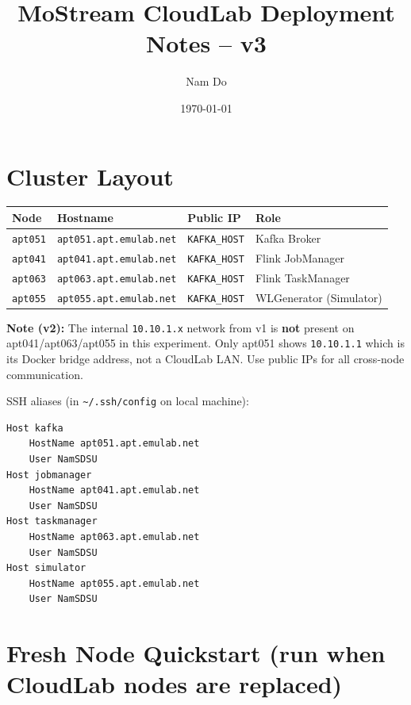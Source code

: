 \documentclass[11pt,a4paper]{article}
\title{\textbf{MoStream CloudLab Deployment Notes -- v3}}
\author{Nam Do}
\date{\today}
\begin{document}
\maketitle
\tableofcontents
\newpage

\section{Cluster Layout}

\begin{center}
\begin{tabular}{llll}
  \toprule
  Node & Hostname & Public IP & Role \\
  \midrule
  \texttt{apt051} & \texttt{apt051.apt.emulab.net} & \texttt{KAFKA_HOST} & Kafka Broker \\
  \texttt{apt041} & \texttt{apt041.apt.emulab.net} & \texttt{KAFKA_HOST} & Flink JobManager \\
  \texttt{apt063} & \texttt{apt063.apt.emulab.net} & \texttt{KAFKA_HOST} & Flink TaskManager \\
  \texttt{apt055} & \texttt{apt055.apt.emulab.net} & \texttt{KAFKA_HOST} & WLGenerator (Simulator) \\
  \bottomrule
\end{tabular}
\end{center}

\textbf{Note (v2):} The internal \texttt{10.10.1.x} network from v1 is \textbf{not} present on
apt041/apt063/apt055 in this experiment. Only apt051 shows \texttt{10.10.1.1} which is its
Docker bridge address, not a CloudLab LAN. Use public IPs for all cross-node communication.

SSH aliases (in \texttt{\textasciitilde/.ssh/config} on local machine):
\begin{lstlisting}
Host kafka
    HostName apt051.apt.emulab.net
    User NamSDSU
Host jobmanager
    HostName apt041.apt.emulab.net
    User NamSDSU
Host taskmanager
    HostName apt063.apt.emulab.net
    User NamSDSU
Host simulator
    HostName apt055.apt.emulab.net
    User NamSDSU
\end{lstlisting}

\section{Fresh Node Quickstart (run when CloudLab nodes are replaced)}
\end{document}
